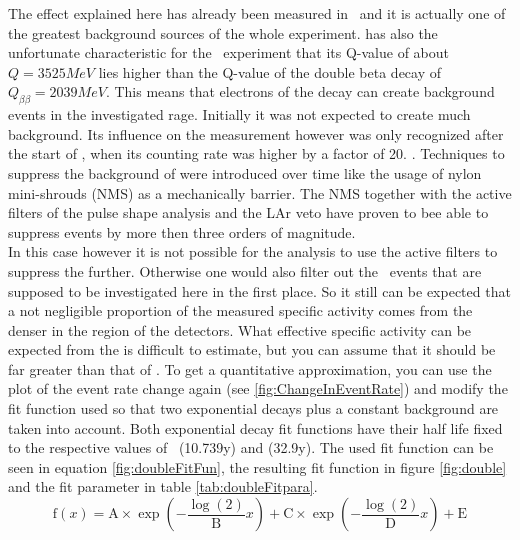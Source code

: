 \documentclass[encoding=utf8,british]{tumphthesis}
\begin{document}
The effect explained here has already been measured in \gerda\ and it is actually one of the greatest background sources of the whole experiment.
 has also the unfortunate characteristic for the \gerda\ experiment that its Q-value of about $Q =3525\unit{MeV}$ lies higher than the Q-value of the double beta decay of  $Q_{\beta \beta} = 2039\unit{MeV}$.
This means that electrons of the  decay can create background events in the investigated rage. 
Initially it was not expected to create much background.
Its influence on the measurement however was only recognized after the start of \PI, when its counting rate was higher by a factor of 20. \cite{becerici_schmidt_results_2014}.
Techniques to suppress the background of  were introduced over time like the usage of nylon mini-shrouds (NMS) as a mechanically barrier.
The NMS together with the active filters of the pulse shape analysis and the LAr veto have proven to bee able to suppress  events by more then three orders of magnitude.
\\

In this case however it is not possible for the analysis to use the active filters to suppress the  further.
Otherwise one would also filter out the \Kr\ events that are supposed to be investigated here in the first place.
So it still can be expected that a not negligible proportion of the measured specific activity comes from the denser  in the region of the detectors.
What effective specific activity can be expected from the  is difficult to estimate, but you can assume that it should be far greater than that of \Kr.
To get a quantitative approximation, you can use the plot of the event rate change again (see \ref{fig:ChangeInEventRate}) and modify the fit function used so that two exponential decays plus a constant background are taken into account.
Both exponential decay fit functions have their half life fixed to the respective values of \Kr\ (10.739y) and  (32.9y).
The used fit function can be seen in equation \ref{fig:doubleFitFun}, the resulting fit function in figure \ref{fig:double} and the fit parameter in table \ref{tab:doubleFitpara}.
\begin{equation}
    \mathrm{f}(x) = \mathrm{A}\times\exp\left(-\frac{\log(2)}{\mathrm{B}} x \right) + \mathrm{C}\times\exp\left(-\frac{\log(2)}{\mathrm{D}} x \right) + \mathrm{E}
    \label{equ:doubleFitFun}
\end{equation}
\end{document}
